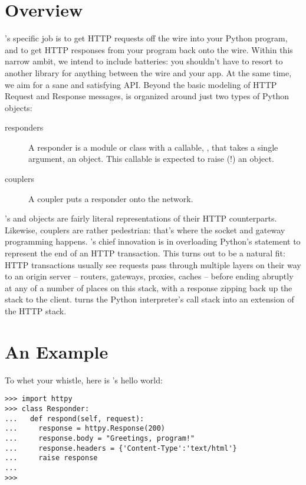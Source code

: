 \section{Overview}

's specific job is to get HTTP requests off the wire into your
Python program, and to get HTTP responses from your program back onto the wire.
Within this narrow ambit, we intend to include batteries: you shouldn't have to
resort to another library for anything between the wire and your app. At the
same time, we aim for a sane and satisfying API. Beyond the basic modeling of
HTTP Request and Response messages,  is organized around just two
types of Python objects:

\begin{description}

\item[responders]
    {A responder is a module or class with a callable, , that
    takes a single argument, an  object. This callable is
    expected to raise (!) an  object.}

\item[couplers]
    {A coupler puts a responder onto the network.}

\end{description}

's  and  objects are fairly literal
representations of their HTTP counterparts. Likewise, couplers are rather
pedestrian: that's where the socket and gateway programming happens.
's chief innovation is in overloading Python's 
statement to represent the end of an HTTP transaction. This turns out to be a
natural fit: HTTP transactions usually see requests pass through multiple layers
on their way to an origin server -- routers, gateways, proxies, caches -- before
ending abruptly at any of a number of places on this stack, with a response
zipping back up the stack to the client.  turns the Python
interpreter's call stack into an extension of the HTTP stack.



\section{An Example}

To whet your whistle, here is 's hello world:

\begin{verbatim}
>>> import httpy
>>> class Responder:
...   def respond(self, request):
...     response = httpy.Response(200)
...     response.body = "Greetings, program!"
...     response.headers = {'Content-Type':'text/html'}
...     raise response
...
>>>
\end{verbatim}

